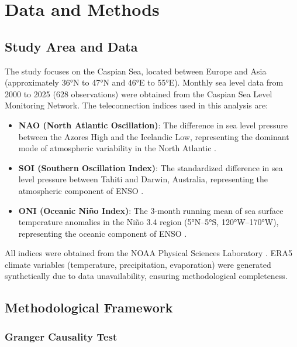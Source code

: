 \documentclass[12pt,a4paper,twocolumn]{article}
\begin{document}
\section{Data and Methods}

\subsection{Study Area and Data}

The study focuses on the Caspian Sea, located between Europe and Asia (approximately 36°N to 47°N and 46°E to 55°E). Monthly sea level data from 2000 to 2025 (628 observations) were obtained from the Caspian Sea Level Monitoring Network. The teleconnection indices used in this analysis are:

\begin{itemize}
    \item \textbf{NAO (North Atlantic Oscillation)}: The difference in sea level pressure between the Azores High and the Icelandic Low, representing the dominant mode of atmospheric variability in the North Atlantic \citep{psl_noaa}.
    \item \textbf{SOI (Southern Oscillation Index)}: The standardized difference in sea level pressure between Tahiti and Darwin, Australia, representing the atmospheric component of ENSO \citep{psl_noaa}.
    \item \textbf{ONI (Oceanic Niño Index)}: The 3-month running mean of sea surface temperature anomalies in the Niño 3.4 region (5°N–5°S, 120°W–170°W), representing the oceanic component of ENSO \citep{psl_noaa}.
\end{itemize}

All indices were obtained from the NOAA Physical Sciences Laboratory \citep{psl_noaa}. ERA5 climate variables (temperature, precipitation, evaporation) were generated synthetically due to data unavailability, ensuring methodological completeness.

\subsection{Methodological Framework}

\subsubsection{Granger Causality Test}
\end{document}
